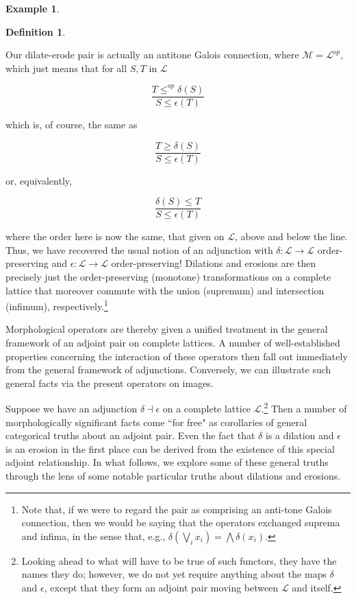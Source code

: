 \documentclass[a4paper]{book}
\theoremstyle{definition}
\newtheorem{example}{Example}[section]
\theoremstyle{definition}
\newtheorem{definition}{Definition}[section]
\theoremstyle{definition}
\theoremstyle{theorem}
\theoremstyle{definition}
\begin{document}
\begin{example}
\begin{definition}
	\end{definition} 
Our dilate-erode pair is actually an antitone Galois connection, where $\mathcal{M} = \mathcal{L}^{op}$, which just means that for all $S, T$ in $\mathcal{L}$ 
\begin{center} 
	\begin{equation*}
	\frac{T \leq^{op} \delta(S)}{S \leq \epsilon(T)}
	\end{equation*}
\end{center}   
which is, of course, the same as 
\begin{center} 
	\begin{equation*}
	\frac{T \geq \delta(S)}{S \leq \epsilon(T)}
	\end{equation*}
\end{center}    
or, equivalently, 
\begin{center} 
	\begin{equation*}
	\frac{\delta(S) \leq T}{S \leq \epsilon(T)}
	\end{equation*}
\end{center}    
where the order here is now the same, that given on $\mathcal{L}$, above and below the line. Thus, we have recovered the usual notion of an adjunction with $\delta: \mathcal{L} \rightarrow \mathcal{L}$ order-preserving and $\epsilon: \mathcal{L} \rightarrow \mathcal{L}$ order-preserving! Dilations and erosions are then precisely just the order-preserving (monotone) transformations on a complete lattice that moreover commute with the union (supremum) and intersection (infimum), respectively.\footnote{Note that, if we were to regard the pair as comprising an anti-tone Galois connection, then we would be saying that the operators exchanged suprema and infima, in the sense that, e.g., $\delta(\bigvee_i x_i) = \bigwedge \delta(x_i)$.} 
\par 
Morphological operators are thereby given a unified treatment in the general framework of an adjoint pair on complete lattices. A number of well-established properties concerning the interaction of these operators then fall out immediately from the general framework of adjunctions. Conversely, we can illustrate such general facts via the present operators on images. \par 
Suppose we have an adjunction $\delta \dashv \epsilon$ on a complete lattice $\mathcal{L}$.\footnote{Looking ahead to what will have to be true of such functors, they have the names they do; however, we do not yet require anything about the maps $\delta$ and $\epsilon$, except that they form an adjoint pair moving between $\mathcal{L}$ and itself.} Then a number of morphologically significant facts come ``for free" as corollaries of general categorical truths about an adjoint pair. Even the fact that $\delta$ is a dilation and $\epsilon$ is an erosion in the first place can be derived from the existence of this special adjoint relationship. In what follows, we explore some of these general truths through the lens of some notable particular truths about dilations and erosions.  

\end{example}
\end{document}
